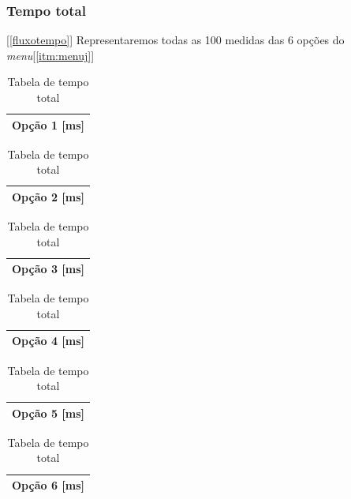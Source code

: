 \documentclass[a4paper,10pt]{article}
\begin{document}
\subsubsection{Tempo total}[\ref{fluxotempo}]
Representaremos todas as 100 medidas das 6 opções do \emph{menu}[\ref{itm:menuj}]
\begin{table}
  \tiny
  \centering
  \begin{tabular}{|c|}
    \hline
    Opção 1 [ms] \\
    \hline
        
    \hline
  \end{tabular}
  \begin{tabular}{|c|}
    \hline
    Opção 2 [ms] \\
    \hline
    
    \hline
  \end{tabular}
  \begin{tabular}{|c|}
    \hline
    Opção 3 [ms] \\
    \hline
    
    \hline
  \end{tabular}
  \begin{tabular}{|c|}
    \hline
    Opção 4 [ms] \\
    \hline
    
    \hline
  \end{tabular}
  \begin{tabular}{|c|}
    \hline
    Opção 5 [ms] \\
    \hline
    
    \hline
  \end{tabular}
  \begin{tabular}{|c|}
    \hline
    Opção 6 [ms] \\
    \hline
    
    \hline
  \end{tabular}
  \caption{Tabela de tempo total}
\end{table}
\newpage
\end{document}
